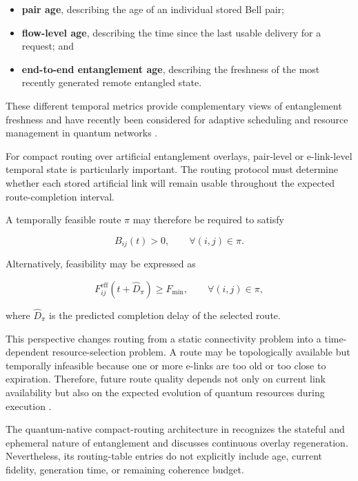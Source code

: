 \begin{itemize}
    \item \textbf{pair age}, describing the age of an individual stored Bell pair;
    \item \textbf{flow-level age}, describing the time since the last usable delivery for a request; and
    \item \textbf{end-to-end entanglement age}, describing the freshness of the most recently generated remote entangled state.
\end{itemize}

These different temporal metrics provide complementary views of entanglement freshness and have recently been considered for adaptive scheduling and resource management in quantum networks \cite{ercetin2026fidelityage,ceran2026age,chen2023adaptive,park2025quantum}.

For compact routing over artificial entanglement overlays, pair-level or e-link-level temporal state is particularly important. The routing protocol must determine whether each stored artificial link will remain usable throughout the expected route-completion interval.

A temporally feasible route $\pi$ may therefore be required to satisfy

\begin{equation}
    B_{ij}(t) > 0,
    \qquad
    \forall (i,j)\in\pi.
\end{equation}

Alternatively, feasibility may be expressed as

\begin{equation}
    F_{ij}^{\mathrm{eff}}
    \left(
    t+\widehat{D}_{\pi}
    \right)
    \geq
    F_{\min},
    \qquad
    \forall (i,j)\in\pi,
\end{equation}

where $\widehat{D}_{\pi}$ is the predicted completion delay of the selected route.

This perspective changes routing from a static connectivity problem into a time-dependent resource-selection problem. A route may be topologically available but temporally infeasible because one or more e-links are too old or too close to expiration. Therefore, future route quality depends not only on current link availability but also on the expected evolution of quantum resources during execution \cite{pant2019routing,halder2024optimal}.

The quantum-native compact-routing architecture in \cite{caleffi2025quantumarchitecture} recognizes the stateful and ephemeral nature of entanglement and discusses continuous overlay regeneration. Nevertheless, its routing-table entries do not explicitly include age, current fidelity, generation time, or remaining coherence budget.

